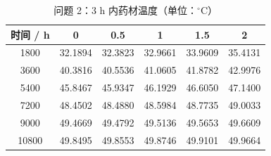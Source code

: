 \begin{table}[htbp]
\centering
\caption{问题 2：3 h 内药材温度（单位：$^\circ$C）}
\label{table_03_p2_temperature}
\begin{tabular}{cccccc}
\toprule
时间 / h & 0 & 0.5 & 1 & 1.5 & 2 \\
\midrule
1800 & 32.1894 & 32.3823 & 32.9661 & 33.9609 & 35.4131 \\
3600 & 40.3816 & 40.5536 & 41.0605 & 41.8782 & 42.9976 \\
5400 & 45.8467 & 45.9347 & 46.1929 & 46.6050 & 47.1400 \\
7200 & 48.4502 & 48.4880 & 48.5984 & 48.7735 & 49.0033 \\
9000 & 49.4669 & 49.4792 & 49.5136 & 49.5653 & 49.6609 \\
10800 & 49.8495 & 49.8553 & 49.8746 & 49.9101 & 49.9664 \\
\bottomrule
\end{tabular}
\end{table}
